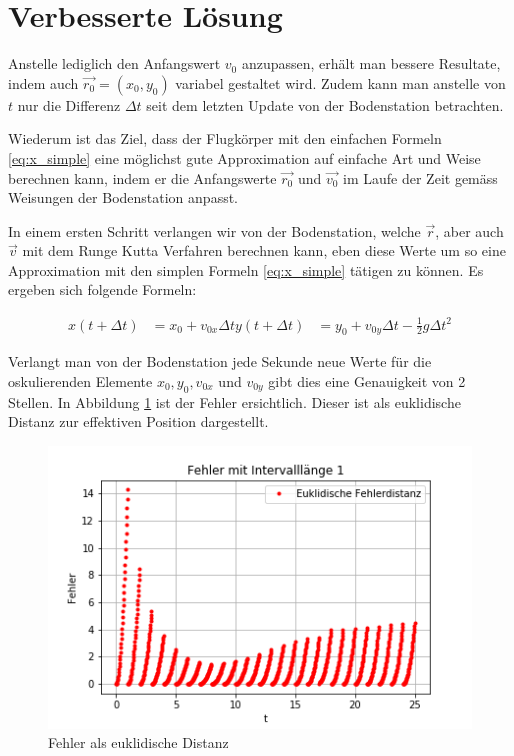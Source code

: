 \section{Verbesserte Lösung
\label{perturbation:section:verbesserte_loesung}}

Anstelle lediglich den Anfangswert $v_0$ anzupassen, erhält man bessere Resultate, indem auch $\vec{r_0} = (x_0, y_0)$ variabel gestaltet wird. 
Zudem kann man anstelle von $t$ nur die Differenz $\Delta t$ seit dem letzten Update von der Bodenstation betrachten.

Wiederum ist das Ziel, dass der Flugkörper mit den einfachen Formeln \eqref{eq:x_simple} eine möglichst gute Approximation auf einfache Art und Weise berechnen kann, indem er die Anfangswerte $\vec{r_0}$ und $\vec{v_0}$ im Laufe der Zeit gemäss Weisungen der Bodenstation anpasst.

In einem ersten Schritt verlangen wir von der Bodenstation, welche $\vec{r}$, aber auch $\vec{v}$ mit dem Runge Kutta Verfahren berechnen kann, eben diese Werte um so eine Approximation mit den simplen Formeln \eqref{eq:x_simple} tätigen zu können. Es ergeben sich folgende Formeln:

\begin{equation}
\begin{aligned}
x(t + \Delta t) &= x_0 + v_{0x}\Delta t
y(t + \Delta t) &= y_0 + v_{0y}\Delta t - \frac{1}{2}g\Delta t^2
\end{aligned}
\end{equation}

Verlangt man von der Bodenstation jede Sekunde neue Werte für die oskulierenden Elemente $x_0, y_0, v_{0x}$ und $v_{0y}$ gibt dies eine Genauigkeit von 2 Stellen. In Abbildung \ref{error} ist der Fehler ersichtlich. Dieser ist als euklidische Distanz zur effektiven Position dargestellt.

\begin{figure}
    \centering
    \includegraphics[scale = 0.7]{papers/perturbation/bilder/Ansatz2_Ordnung0_Errors.png}
    \caption{Fehler als euklidische Distanz}
	\label{error}
\end{figure}